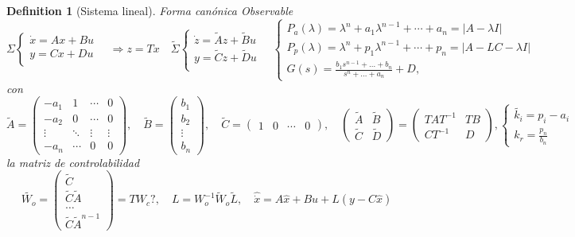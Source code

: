 \documentclass[leqno]{article}
\newtheorem*{definition}{Definition}
\begin{document}
\begin{definition}[Sistema lineal] Forma canónica Observable
\[
\Sigma  \begin{cases}
  \dot{x}=Ax + Bu \\ 
  y = Cx + Du\\
\end{cases}
\quad \Rightarrow z=Tx \quad 
\tilde{\Sigma }  \begin{cases}
  \dot{z} = \tilde{A}z + \tilde{B}u \\
  y = \tilde{C} z + \tilde{D}u\\
\end{cases}
\quad \begin{cases}
 P_a(\lambda) = \lambda^n +  a_1 \lambda^{n-1} + \cdots + a_n = |A-\lambda I|\\
 P_{p}(\lambda) = \lambda^n + p_1\lambda^{n-1} + \cdots +  p_n = |A-LC-\lambda I|\\
 G(s) = \frac{b_1s ^{n-1}+ \ldots + b_n}{ s^n + \ldots+ a_n} + D,
\end{cases}
\] 
con 
\[
  \tilde{A} = \begin{pmatrix} -a_1 & 1 & \cdots & 0 \\ -a_2 & 0 & \cdots & 0 \\ \vdots & \ddots & \vdots & \vdots \\ -a_n & \cdots & 0 & 0  \end{pmatrix}
  , \quad \tilde{B} = \begin{pmatrix} b_1\\ b_2 \\ \vdots \\b_n \end{pmatrix},
  \quad \tilde{C} = \begin{pmatrix} 1 & 0 & \cdots & 0 \end{pmatrix},
  \quad \begin{pmatrix} \tilde{A} & \tilde{B} \\ \tilde{C} & \tilde{D} \end{pmatrix}  = \begin{pmatrix} TAT^{-1} & TB \\ CT^{-1} & D \end{pmatrix}, \begin{cases}
\tilde{k_i} = p_i-a_i \\ k_r = \frac{p_n}{b_n} \end{cases}
\] 
la matriz de controlabilidad
\[
  \tilde{W_o} = \begin{pmatrix} \tilde{C} \\ \tilde{C}\tilde{A} \\ \ldots \\ \tilde{C}\tilde{A}^{n-1} \end{pmatrix} = TW_c ?, \quad  L = W_o^{-1}\tilde{W}_o \tilde{L}, \quad \hat{\dot{x}} = A\hat{x} + Bu + L (y-C \hat{x}) 
\] 
\end{definition}
\end{document}
